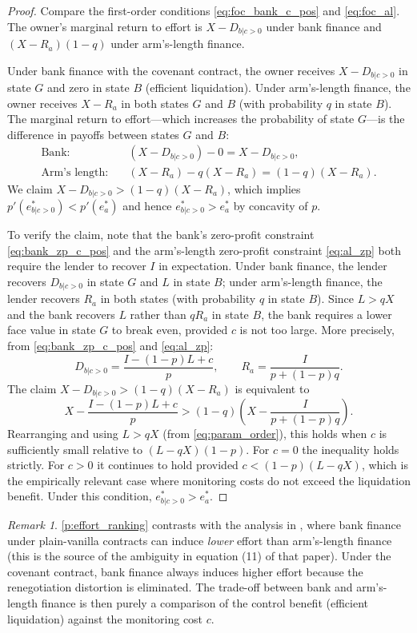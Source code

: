 \documentclass[12pt,a4paper]{article}
\theoremstyle{plain}
\theoremstyle{definition}
\theoremstyle{remark}
\newtheorem{remark}[theorem]{Remark}
\begin{document}
\begin{proof}
Compare the first-order conditions \cref{eq:foc_bank_c_pos} and \cref{eq:foc_al}.
The owner's marginal return to effort is $X - D_{b|c>0}$ under bank finance and
$(X - R_a)(1-q)$ under arm's-length finance.

Under bank finance with the covenant contract, the owner receives $X - D_{b|c>0}$ in
state $G$ and zero in state $B$ (efficient liquidation). Under arm's-length finance,
the owner receives $X - R_a$ in both states $G$ and $B$ (with probability $q$ in
state $B$). The marginal return to effort---which increases the probability of state
$G$---is the difference in payoffs between states $G$ and $B$:
\begin{align}
  \text{Bank:} & \quad (X - D_{b|c>0}) - 0 = X - D_{b|c>0}, \\
  \text{Arm's length:} & \quad (X - R_a) - q(X - R_a) = (1-q)(X - R_a).
\end{align}
We claim $X - D_{b|c>0} > (1-q)(X - R_a)$, which implies $p'(e^*_{b|c>0}) <
p'(e^*_a)$ and hence $e^*_{b|c>0} > e^*_a$ by concavity of $p$.

To verify the claim, note that the bank's zero-profit constraint \cref{eq:bank_zp_c_pos}
and the arm's-length zero-profit constraint \cref{eq:al_zp} both require the lender
to recover $I$ in expectation. Under bank finance, the lender recovers $D_{b|c>0}$
in state $G$ and $L$ in state $B$; under arm's-length finance, the lender recovers
$R_a$ in both states (with probability $q$ in state $B$). Since $L > qX$ and the
bank recovers $L$ rather than $qR_a$ in state $B$, the bank requires a lower face
value in state $G$ to break even, provided $c$ is not too large. More precisely,
from \cref{eq:bank_zp_c_pos} and \cref{eq:al_zp}:
\[
  D_{b|c>0} = \frac{I - (1-p)L + c}{p}, \qquad R_a = \frac{I}{p + (1-p)q}.
\]
The claim $X - D_{b|c>0} > (1-q)(X-R_a)$ is equivalent to
\[
  X - \frac{I-(1-p)L+c}{p} > (1-q)\!\left(X - \frac{I}{p+(1-p)q}\right).
\]
Rearranging and using $L > qX$ (from \cref{eq:param_order}), this holds when $c$ is
sufficiently small relative to $(L - qX)(1-p)$. For $c = 0$ the inequality holds
strictly. For $c > 0$ it continues to hold provided $c < (1-p)(L-qX)$, which is
the empirically relevant case where monitoring costs do not exceed the liquidation
benefit. Under this condition, $e^*_{b|c>0} > e^*_a$.
\end{proof}

\begin{remark}
\label{r:effort_direction}
\cref{p:effort_ranking} contrasts with the analysis in \citet{Rajan1992}, where bank
finance under plain-vanilla contracts can induce \emph{lower} effort than arm's-length
finance (this is the source of the ambiguity in equation (11) of that paper). Under
the covenant contract, bank finance always induces higher effort because the
renegotiation distortion is eliminated. The trade-off between bank and arm's-length
finance is then purely a comparison of the control benefit (efficient liquidation)
against the monitoring cost $c$.
\end{remark}
\end{document}
